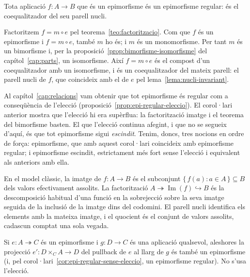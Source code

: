 \begin{corollari}\label{cor:epi-regular-sense-eleccio}
Tota aplicació \(f\colon A\to B\) que és un epimorfisme és un epimorfisme
regular: és el coequalitzador del seu parell nucli.
\end{corollari}

\begin{prova}
Factoritzem \(f=m\circ e\) pel teorema~\ref{teo:factoritzacio}. Com que
\(f\) és un epimorfisme i \(f=m\circ e\), també \(m\) ho és; i \(m\) és un
monomorfisme. Per tant \(m\) és un bimorfisme i, per la
proposició~\ref{prop:bimorfisme-isomorfisme} del capítol~\ref{cap:parts},
un isomorfisme. Així \(f=m\circ e\) és el compost d'un coequalitzador amb
un isomorfisme, i és un coequalitzador del mateix parell: el parell
nucli de \(f\), que coincideix amb el de \(e\) pel
lema~\ref{lema:nucli-invariant}.
\end{prova}

\begin{observacio}\label{obs:epi-regular-revisat}
Al capítol~\ref{cap:relacions} vam obtenir que tot epimorfisme és regular
com a conseqüència de l'elecció (proposició~\ref{prop:epi-regular-eleccio}).
El corol·lari anterior mostra que l'elecció hi era supèrflua: la
factorització imatge i el teorema del bimorfisme basten. El que l'elecció
continua afegint, i que no se segueix d'aquí, és que tot epimorfisme
sigui \emph{escindit}. Tenim, doncs, tres nocions en ordre de força:
epimorfisme, que amb aquest corol·lari coincideix amb epimorfisme regular;
i epimorfisme escindit, estrictament més fort sense l'elecció i
equivalent als anteriors amb ella.
\end{observacio}

\begin{observacio}\label{obs:imatge-classica}
En el model clàssic, la imatge de \(f\colon A\to B\) és el subconjunt
\(\{\,f(a):a\in A\,\}\subseteq B\) dels valors efectivament assolits. La
factorització \(A\twoheadrightarrow\operatorname{Im}(f)\hookrightarrow B\)
és la descomposició habitual d'una funció en la sobrejecció sobre la seva
imatge seguida de la inclusió de la imatge dins del codomini. El parell
nucli identifica els elements amb la mateixa imatge, i el quocient és el
conjunt de valors assolits, cadascun comptat una sola vegada.
\end{observacio}

\begin{lema}\label{lema:estabilitat-epi-regular}
Si \(e\colon A\twoheadrightarrow C\) és un epimorfisme i \(g\colon D\to C\)
és una aplicació qualsevol, aleshores la projecció
\(e'\colon D\times_C A\to D\) del pullback de \(e\) al llarg de \(g\) és
també un epimorfisme (i, pel corol·lari~\ref{cor:epi-regular-sense-eleccio},
un epimorfisme regular). No s'usa l'elecció.
\end{lema}

